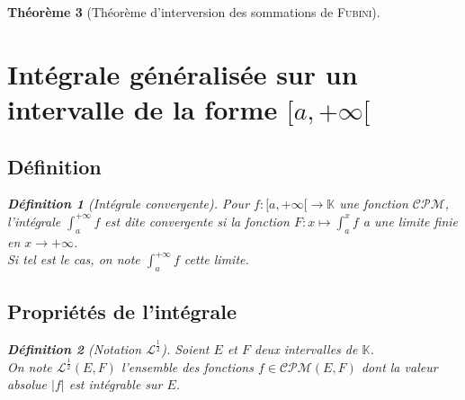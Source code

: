 \documentclass[11pt,a4paper]{report}
\newtheorem{theorem}{Théorème}[chapter]
\theoremstyle{definition}
\newtheorem{dfn}[theorem]{Définition}
\begin{document}
\begin{theorem}[Théorème d'interversion des sommations de \textsc{Fubini}]
\section{Intégrale généralisée sur un intervalle de la forme $[a,+\infty[$} %
\label{sec:integrale_generalisee}
\subsection{Définition} %
\label{sub:definition}
\begin{dfn}[Intégrale convergente]
    \label{dfn:integrale_convergente}
     Pour $f : [a,+\infty[ \to \mathbb{K}$ une fonction $\mathcal{CPM}$, l'intégrale $\int_a^{+\infty} f$ est dite \emph{convergente} si la fonction $F : x \mapsto \int_a^x f$ a une limite finie en $x\to +\infty$.\\
     Si tel est le cas, on note $\int_a^{+\infty} f$ cette limite.
\end{dfn}

\subsection{Propriétés de l'intégrale} %
\label{sub:proprietes_integrale}
\begin{dfn}[Notation $\mathcal{L}^\frac{1}{2}$]
     Soient $E$ et $F$ deux intervalles de $\mathbb{K}$.\\
     On note $\mathcal{L}^\frac{1}{2}(E,F)$ l'ensemble des fonctions $f \in \mathcal{CPM}(E,F)$ dont la valeur absolue $|f|$ est intégrable sur $E$.
\end{dfn}

\end{theorem}
\end{document}
